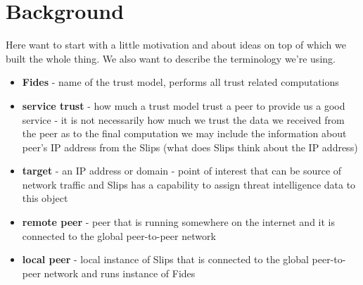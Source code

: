 \chapter{Background}
Here want to start with a little motivation and about ideas on top of which we built the whole thing. 
We also want to describe the terminology we're using.

\begin{itemize}
\item \textbf{Fides} - name of the trust model, performs all trust related computations
\item \textbf{service trust} - how much a trust model trust a peer to provide us a good service - it is not necessarily how much we trust the data we received from the peer as to the final computation we may include the information about peer's IP address from the Slips (what does Slips think about the IP address)
\item \textbf{target} - an IP address or domain - point of interest that can be source of network traffic and Slips has a capability to assign threat intelligence data to this object
\item \textbf{remote peer} - peer that is running somewhere on the internet and it is connected to the global peer-to-peer network
\item \textbf{local peer} - local instance of Slips that is connected to the global peer-to-peer network and runs instance of Fides
\end{itemize}







